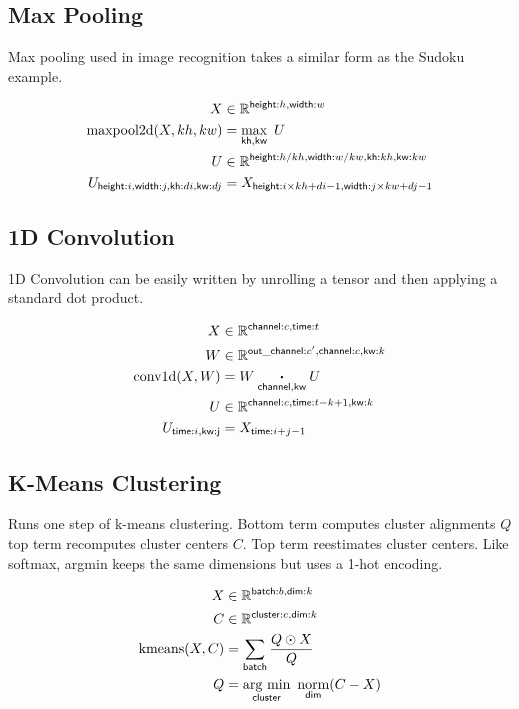 \documentclass{article}
\newcommand{\name}[1]{\mathsf{#1}}
\newcommand{\ndot}[1]{\mathbin{\mathop{\thinspace\boldsymbol\cdot\thinspace}\displaylimits_{\name{#1}}}}
\newcommand{\nsum}[1]{\mathop{\sum}_{\name{#1}}}
\newcommand{\nfun}[2]{\mathop{\text{#2}}\displaylimits_{\name{#1}}}
\newcommand{\reals}{\mathbb{R}}
\begin{document}
\subsection{Max Pooling}

Max pooling used in image recognition takes a similar form as the Sudoku example.

\begin{align*} 
X &\in \reals^{\name{height}: h, \name{width}:w} \\
\text{maxpool2d}(X, kh, kw) &=  \nfun{kh, kw}{max}\  U \\
U &\in \reals^{{\name{height}:h / kh,
\name{width}:w / kw, \name{kh}:kh, \name{kw}:kw}}  \\
U_{\name{height}:i, \name{width}:j, \name{kh}:di, \name{kw}:dj  } & = X_{\name{height}:i \times kh + di -1, \name{width}:j \times kw + dj -1}  
\end{align*}



\subsection{1D Convolution}

1D Convolution can be easily written by unrolling a tensor and then
applying a standard dot product.

\begin{align*} 
X &\in \reals^{{\name{channel}:c, \name{time}:t}}  \\
W &\in \reals^{{\name{out\_channel}:c', \name{channel}:c, \name{kw}:k}}  \\
\text{conv1d}(X, W) &= W \ndot{channel, kw} U \\
U &\in \reals^{{\name{channel}:c, \name{time}:t-k +1, \name{kw}:k}}  \\
U_{\name{time}:i, \name{kw:j}} & = X_{\name{time}:i+j - 1}  
\end{align*} 


\subsection{K-Means Clustering}

Runs one step of k-means clustering. Bottom term computes cluster
alignments $Q$ top term recomputes cluster centers $C$. Top term
reestimates cluster centers. Like softmax, argmin keeps the same
dimensions but uses a 1-hot encoding.

\begin{align*} 
X &\in \reals^{\name{batch}:b, \name{dim}:k}  \\
C &\in \reals^{\name{cluster}:c, \name{dim}:k}  \\
\text{kmeans}(X, C) &= \nsum{batch} \frac{ Q \odot X}{  Q} \\
Q &= \nfun{cluster}{arg~min} \ \nfun{dim}{norm}(C-X
)\end{align*}
\end{document}
